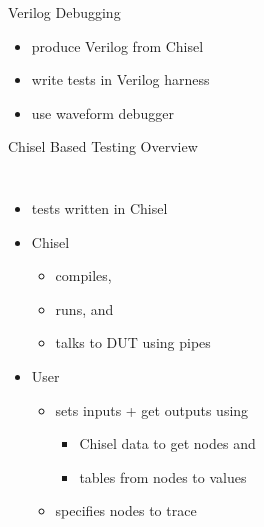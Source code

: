 \documentclass[xcolor=pdflatex,dvipsnames,table]{beamer}
\begin{document}
\begin{frame}{Verilog Debugging}
\begin{itemize}
\item produce Verilog from Chisel
\item write tests in Verilog harness
\item use waveform debugger
\end{itemize}
\end{frame}

\begin{frame}{Chisel Based Testing Overview}
\begin{columns}
\begin{itemize}
\item tests written in Chisel
\item Chisel
\begin{itemize}
\item compiles, 
\item runs, and 
\item talks to DUT using pipes
\end{itemize}
\item User
\begin{itemize}
\item sets inputs + get outputs using
\begin{itemize}
\item Chisel data to get nodes and
\item tables from nodes to values
\end{itemize}
\item specifies nodes to trace
\end{itemize}
\end{itemize}


\end{columns}
\end{frame}
\end{document}
